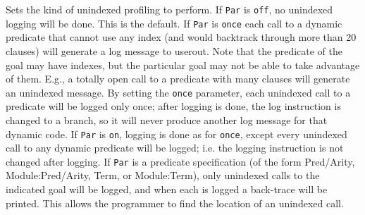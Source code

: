 \begin{description}


Sets the kind of unindexed profiling to perform.  If {\tt Par} is
\texttt{off}, no unindexed logging will be done.  This is the default.
If {\tt Par} is \texttt{once} each call to a dynamic predicate that
cannot use any index (and would backtrack through more than 20
clauses) will generate a log message to userout.  Note that the
predicate of the goal may have indexes, but the particular goal may
not be able to take advantage of them.  E.g., a totally open call to a
predicate with many clauses will generate an unindexed message.  By
setting the {\tt once} parameter, each unindexed call to a predicate
will be logged only once; after logging is done, the log instruction
is changed to a branch, so it will never produce another log message
for that dynamic code.  If {\tt Par} is \texttt{on}, logging is done
as for \texttt{once}, except every unindexed call to any dynamic
predicate will be logged; i.e. the logging instruction is not changed
after logging.  If {\tt Par} is a predicate specification (of the form
Pred/Arity, Module:Pred/Arity, Term, or Module:Term), only unindexed
calls to the indicated goal will be logged, and when each is logged a
back-trace will be printed.  This allows the programmer to find the
location of an unindexed call.
\end{description}

